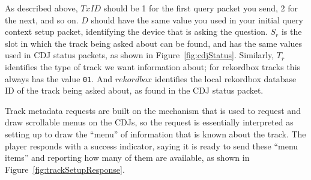 \documentclass[11pt]{article}
\begin{document}
As described above, $TxID$ should be 1 for the first query packet you
send, 2 for the next, and so on. $D$ should have the same value you
used in your initial query context setup packet, identifying the
device that is asking the question. $S_r$ is the slot in which the
track being asked about can be found, and has the same values used in
CDJ status packets, as shown in Figure~\ref{fig:cdjStatus}. Similarly,
$T_r$ identifies the type of track we want information about; for
rekordbox tracks this always has the value {\tt 01}. And $rekordbox$
identifies the local rekordbox database ID of the track being asked
about, as found in the CDJ status packet.

Track metadata requests are built on the mechanism that is used to
request and draw scrollable menus on the CDJs, so the request is
essentially interpreted as setting up to draw the ``menu'' of
information that is known about the track. The player responds with a
success indicator, saying it is ready to send these ``menu items'' and
reporting how many of them are available, as shown in
Figure~\ref{fig:trackSetupResponse}.
\end{document}
